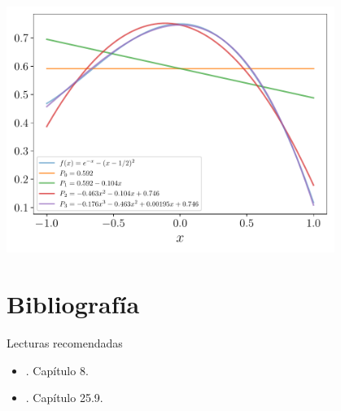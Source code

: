 \documentclass[9pt, aspectratio=169]{beamer}
\begin{document}
\begin{frame}
    \begin{center}
        \includegraphics[width=0.8\textwidth]{figs/fig-05.pdf}
    \end{center}
\end{frame}

\section*{Bibliografía}
\begin{frame}[allowframebreaks]{Lecturas recomendadas}
\begin{itemize}
    \item {}. Capítulo 8.
    \item {}. Capítulo 25.9.
\end{itemize}
\end{frame}
\end{document}

